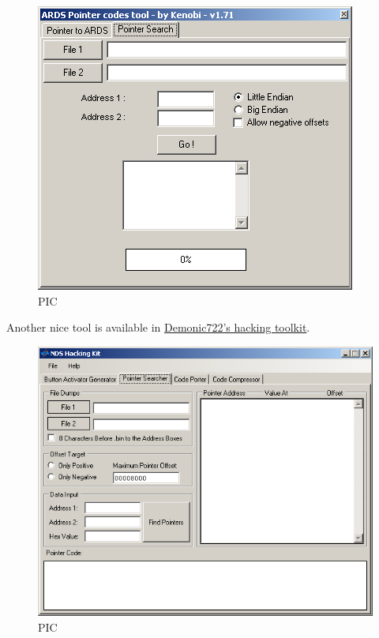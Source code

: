 \documentclass[
]{book}
\begin{document}
\begin{figure}
\centering
\includegraphics{images/209_home_fast6191_romhackingguide_unrenamed_fil___al_borders_romhackingguidendspointerkenobi1.png}
\caption{PIC}
\end{figure}

Another nice tool is available in \href{http://filetrip.net/nds-downloads/applications/latest-nds-hacking-kit-f29363.html}{Demonic722's hacking toolkit}.

\begin{figure}
\centering
\includegraphics{images/210_home_fast6191_romhackingguide_unrenamed_fil___ckguidecheatmakingdemonic722hackingtoolkit1.png}
\caption{PIC}
\end{figure}
\end{document}
